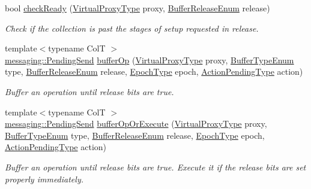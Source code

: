 \begin{DoxyCompactItemize}
bool \hyperlink{structvt_1_1vrt_1_1collection_1_1_collection_manager_a842ef81ac4f1562b35a27126cfd26159}{check\+Ready} (\hyperlink{namespacevt_a1b417dd5d684f045bb58a0ede70045ac}{Virtual\+Proxy\+Type} proxy, \hyperlink{namespacevt_1_1vrt_1_1collection_a2545006e681bacc1f00be9d5d6bdc8fa}{Buffer\+Release\+Enum} release)
\begin{DoxyCompactList}\small\item\em Check if the collection is past the stages of setup requested in release. \end{DoxyCompactList}\item 
{\footnotesize template$<$typename ColT $>$ }\\\hyperlink{structvt_1_1messaging_1_1_pending_send}{messaging\+::\+Pending\+Send} \hyperlink{structvt_1_1vrt_1_1collection_1_1_collection_manager_ac5ba46c0eac77a81aec0c6119de6778c}{buffer\+Op} (\hyperlink{namespacevt_a1b417dd5d684f045bb58a0ede70045ac}{Virtual\+Proxy\+Type} proxy, \hyperlink{namespacevt_1_1vrt_1_1collection_a1b1b082e2ff4e9e5d1b7227acd78db3f}{Buffer\+Type\+Enum} type, \hyperlink{namespacevt_1_1vrt_1_1collection_a2545006e681bacc1f00be9d5d6bdc8fa}{Buffer\+Release\+Enum} release, \hyperlink{namespacevt_a985a5adf291c34a3ca263b3378388236}{Epoch\+Type} epoch, \hyperlink{structvt_1_1vrt_1_1collection_1_1_collection_manager_a61252b0d805cdb8fdea35439de468001}{Action\+Pending\+Type} action)
\begin{DoxyCompactList}\small\item\em Buffer an operation until release bits are true. \end{DoxyCompactList}\item 
{\footnotesize template$<$typename ColT $>$ }\\\hyperlink{structvt_1_1messaging_1_1_pending_send}{messaging\+::\+Pending\+Send} \hyperlink{structvt_1_1vrt_1_1collection_1_1_collection_manager_a062ee2034ac6bba36a35580b570de23f}{buffer\+Op\+Or\+Execute} (\hyperlink{namespacevt_a1b417dd5d684f045bb58a0ede70045ac}{Virtual\+Proxy\+Type} proxy, \hyperlink{namespacevt_1_1vrt_1_1collection_a1b1b082e2ff4e9e5d1b7227acd78db3f}{Buffer\+Type\+Enum} type, \hyperlink{namespacevt_1_1vrt_1_1collection_a2545006e681bacc1f00be9d5d6bdc8fa}{Buffer\+Release\+Enum} release, \hyperlink{namespacevt_a985a5adf291c34a3ca263b3378388236}{Epoch\+Type} epoch, \hyperlink{structvt_1_1vrt_1_1collection_1_1_collection_manager_a61252b0d805cdb8fdea35439de468001}{Action\+Pending\+Type} action)
\begin{DoxyCompactList}\small\item\em Buffer an operation until release bits are true. Execute it if the release bits are set properly immediately. \end{DoxyCompactList}\item 

\end{DoxyCompactItemize}
